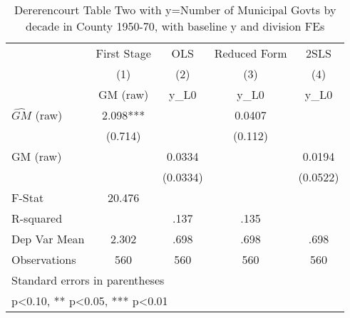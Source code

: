 \begin{table}[htbp]\centering
\def\sym#1{\ifmmode^{#1}\else\(^{#1}\)\fi}
\caption{Dererencourt Table Two with y=Number of Municipal Govts by decade in County 1950-70, with baseline y and division FEs}
\begin{tabular}{l*{4}{c}}
\toprule
                    & First Stage   &         OLS   &Reduced Form   &        2SLS   \\
                    &\multicolumn{1}{c}{(1)}&\multicolumn{1}{c}{(2)}&\multicolumn{1}{c}{(3)}&\multicolumn{1}{c}{(4)}\\
                    &\multicolumn{1}{c}{GM  (raw)}&\multicolumn{1}{c}{y\_L0}&\multicolumn{1}{c}{y\_L0}&\multicolumn{1}{c}{y\_L0}\\
\midrule
$\hat{GM}$ (raw)    &       2.098***&               &      0.0407   &               \\
                    &     (0.714)   &               &     (0.112)   &               \\
\addlinespace
GM  (raw)           &               &      0.0334   &               &      0.0194   \\
                    &               &    (0.0334)   &               &    (0.0522)   \\
\midrule
F-Stat              &      20.476   &               &               &               \\
R-squared           &               &        .137   &        .135   &               \\
Dep Var Mean        &       2.302   &        .698   &        .698   &        .698   \\
Observations        &         560   &         560   &         560   &         560   \\
\bottomrule
\multicolumn{5}{l}{\footnotesize Standard errors in parentheses}\\
\multicolumn{5}{l}{\footnotesize * p<0.10, ** p<0.05, *** p<0.01}\\
\end{tabular}
\end{table}
